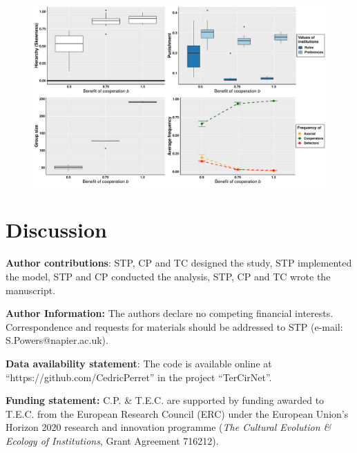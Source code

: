 \documentclass{rstb}
\begin{document}
\begin{linenumbers}
\begin{figure}
    \centering
    \includegraphics[width=0.8\linewidth]{Figures/pt_coopB.pdf}
    \caption{}
    \label{figB}
\end{figure}



\section*{Discussion}





\textbf{Author contributions}: STP, CP and TC designed the study, STP implemented the model, STP and CP conducted the analysis, STP, CP and TC wrote the manuscript.

\textbf{Author Information:} The authors declare no competing financial interests. Correspondence and requests for materials should be addressed to STP (e-mail: S.Powers@napier.ac.uk).

\textbf{Data availability statement}: The code is available online at\\ ``https://github.com/CedricPerret'' in the project ``TerCirNet''.

\textbf{Funding statement:} C.P. \& T.E.C. are supported by funding awarded to T.E.C. from the European Research Council (ERC) under the European Union’s Horizon 2020 research and innovation programme (\textit{The Cultural Evolution \& Ecology of Institutions}, Grant Agreement 716212).







\end{linenumbers}
\end{document}
